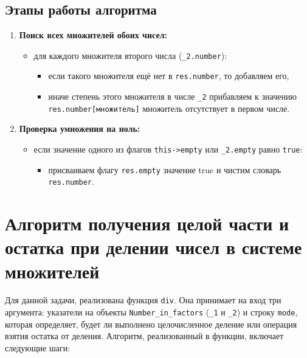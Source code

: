\subsection*{Этапы работы алгоритма}
\begin{enumerate}
	\item \textbf{Поиск всех множителей обоих чисел:}
	\begin{itemize}
		\item для каждого множителя второго числа (\texttt{\_2.number}):
		\begin{itemize}
			\item если такого множителя ещё нет в \texttt{res.number}, то добавляем его,
			\item иначе степень этого множителя в числе \texttt{\_2} прибавляем к значению \texttt{res.number[множитель]} множитель отсутствует в первом числе.
		\end{itemize}
	\end{itemize}
	
	\item \textbf{Проверка умножения на ноль:}
	\begin{itemize}
		\item если значение одного из флагов \texttt{this->empty} или \texttt{\_2.empty} равно \texttt{true}:
		\begin{itemize}
			\item присваиваем флагу \texttt{res.empty} значение true и чистим словарь \texttt{res.number}.
		\end{itemize}
	\end{itemize}
\end{enumerate}

\section{Алгоритм получения целой части и остатка при делении чисел в системе множителей} 

Для данной задачи, реализована функция \texttt{div}. Она принимает на вход три аргумента: указатели на объекты \texttt{Number\_in\_factors} (\texttt{\_1} и \texttt{\_2}) и строку \texttt{mode}, которая определяет, будет ли выполнено целочисленное деление или операция взятия остатка от деления. Алгоритм, реализованный в функции, включает следующие шаги:

